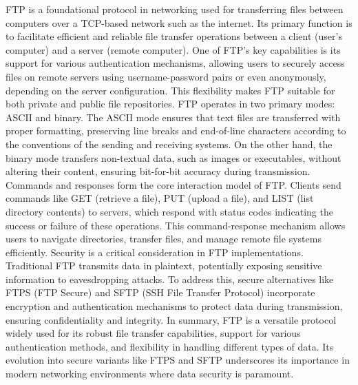 \documentclass{article}
\begin{document}
	FTP is a foundational protocol in networking used for transferring files between computers over a TCP-based network such as the internet. Its primary function is to facilitate efficient and reliable file transfer operations between a client (user's computer) and a server (remote computer). One of FTP's key capabilities is its support for various authentication mechanisms, allowing users to securely access files on remote servers using username-password pairs or even anonymously, depending on the server configuration. This flexibility makes FTP suitable for both private and public file repositories. FTP operates in two primary modes: ASCII and binary. The ASCII mode ensures that text files are transferred with proper formatting, preserving line breaks and end-of-line characters according to the conventions of the sending and receiving systems. On the other hand, the binary mode transfers non-textual data, such as images or executables, without altering their content, ensuring bit-for-bit accuracy during transmission. Commands and responses form the core interaction model of FTP. Clients send commands like GET (retrieve a file), PUT (upload a file), and LIST (list directory contents) to servers, which respond with status codes indicating the success or failure of these operations. This command-response mechanism allows users to navigate directories, transfer files, and manage remote file systems efficiently. Security is a critical consideration in FTP implementations. Traditional FTP transmits data in plaintext, potentially exposing sensitive information to eavesdropping attacks. To address this, secure alternatives like FTPS (FTP Secure) and SFTP (SSH File Transfer Protocol) incorporate encryption and authentication mechanisms to protect data during transmission, ensuring confidentiality and integrity. In summary, FTP is a versatile protocol widely used for its robust file transfer capabilities, support for various authentication methods, and flexibility in handling different types of data. Its evolution into secure variants like FTPS and SFTP underscores its importance in modern networking environments where data security is paramount.\\
	
\end{document}
